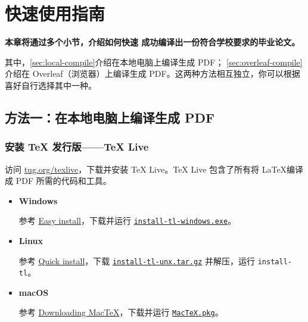 \chapter{快速使用指南}
\label{ch:quick-start}

\textbf{本章将通过多个小节，介绍如何快速
成功编译出一份符合学校要求的毕业论文。}

其中，\autoref{sec:local-compile}介绍在本地电脑上编译生成 PDF；
\autoref{sec:overleaf-compile}介绍在 Overleaf（浏览器）上编译生成 PDF。这两种方法相互独立，你可以根据喜好自行选择其中一种。

\section{方法一：在本地电脑上编译生成 PDF}
\label{sec:local-compile}

\subsection{安装 TeX 发行版——TeX Live}

访问 \href{https://tug.org/texlive/}{tug.org/texlive}，下载并安装 TeX Live。TeX Live 包含了所有将 \LaTeX 编译成 PDF 所需的代码和工具。

\begin{itemize}[nosep]
  \item \textbf{Windows}
  
  参考 \href{https://www.tug.org/texlive/windows.html#install}{Easy install}，下载并运行 \href{https://mirror.ctan.org/systems/texlive/tlnet/install-tl-windows.exe}{\texttt{install-tl-windows.exe}}。
  
  \item \textbf{Linux}
  
  参考 \href{https://www.tug.org/texlive/quickinstall.html}{Quick install}，下载 \href{https://mirror.ctan.org/systems/texlive/tlnet/install-tl-unx.tar.gz}{\texttt{install-tl-unx.tar.gz}} 并解压，运行 \texttt{install-tl}。
  
  \item \textbf{macOS}
  
  参考 \href{https://www.tug.org/mactex/mactex-download.html}{Downloading MacTeX}，下载并运行 \href{https://mirror.ctan.org/systems/mac/mactex/MacTeX.pkg}{\texttt{MacTeX.pkg}}。
\end{itemize}

